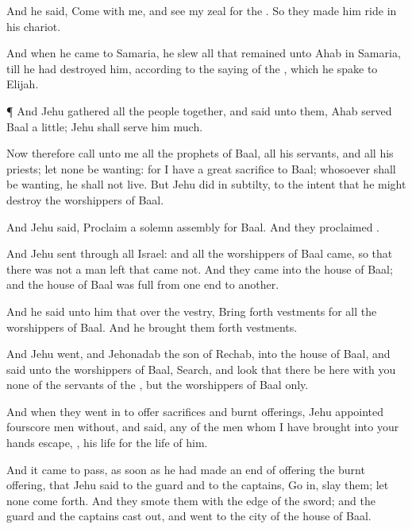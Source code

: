 {And he
said,
Come with me, and
see my
zeal for the
{}. So they made him
ride in his
chariot.

And when he
came to
Samaria, he
slew all that
remained unto
Ahab in
Samaria, till he had
destroyed him, according to the
saying of the
{}, which he
spake to
Elijah.


\par }{\PP {}¶ And
Jehu
gathered all the
people
together, and
said unto them,
Ahab
served
Baal a
little;
{}
Jehu shall
serve him
much.

Now therefore
call unto me all the
prophets of
Baal, all his
servants, and all his
priests; let
none be
wanting: for I have a
great
sacrifice
{} to
Baal; whosoever shall be
wanting, he shall not
live. But
Jehu
did
{} in
subtilty, to the intent that he might
destroy the
worshippers of
Baal.

And
Jehu
said,
Proclaim a solemn
assembly for
Baal. And they
proclaimed
{}.

And
Jehu
sent through all
Israel: and all the
worshippers of
Baal
came, so that there was not a
man
left that
came not. And they
came into the
house of
Baal; and the
house of
Baal was
full from one
end to
another.

And he
said unto him that
{} over the
vestry, Bring
forth
vestments for all the
worshippers of
Baal. And he brought them
forth
vestments.

And
Jehu
went, and
Jehonadab the
son of
Rechab, into the
house of
Baal, and
said unto the
worshippers of
Baal,
Search, and
look that there
be here with you none of the
servants of the
{}, but the
worshippers of
Baal only.

And when they went
in to
offer
sacrifices and burnt
offerings,
Jehu
appointed
fourscore
men
without, and
said,
{}
any of the
men whom I have
brought into your
hands
escape,
{}, his
life
{} for the
life of him.

And it came to pass, as soon as he had made an
end of
offering the burnt
offering, that
Jehu
said to the
guard and to the
captains, Go
in,
{}
slay them; let
none come
forth. And they
smote them with the
edge of the
sword; and the
guard and the
captains cast
{}
out, and
went to the
city of the
house of
Baal.

}
